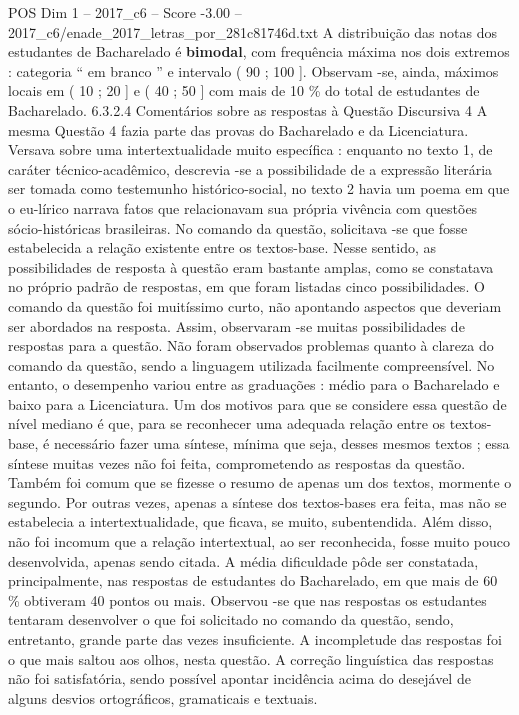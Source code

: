\begin{textsample}{POS Dim 1 – 2017\_c6 – Score -3.00 – 2017\_c6/enade\_2017\_letras\_por\_281c81746d.txt}
A distribuição das notas dos estudantes de Bacharelado é \textbf{bimodal}, com frequência máxima nos dois extremos : categoria “ em branco ” e intervalo ( 90 ; 100 ].
Observam -se, ainda, máximos locais em ( 10 ; 20 ] e ( 40 ; 50 ] com mais de 10 \% do total de estudantes de Bacharelado. 6.3.2.4 Comentários sobre as respostas à Questão Discursiva 4 A mesma Questão 4 fazia parte das provas do Bacharelado e da Licenciatura.
Versava sobre uma intertextualidade muito específica : enquanto no texto 1, de caráter técnico-acadêmico, descrevia -se a possibilidade de a expressão literária ser tomada como testemunho histórico-social, no texto 2 havia um poema em que o eu-lírico narrava fatos que relacionavam sua própria vivência com questões sócio-históricas brasileiras.
No comando da questão, solicitava -se que fosse estabelecida a relação existente entre os textos-base.
Nesse sentido, as possibilidades de resposta à questão eram bastante amplas, como se constatava no próprio padrão de respostas, em que foram listadas cinco possibilidades.
O comando da questão foi muitíssimo curto, não apontando aspectos que deveriam ser abordados na resposta.
Assim, observaram -se muitas possibilidades de respostas para a questão.
Não foram observados problemas quanto à clareza do comando da questão, sendo a linguagem utilizada facilmente compreensível.
No entanto, o desempenho variou entre as graduações : médio para o Bacharelado e baixo para a Licenciatura.
Um dos motivos para que se considere essa questão de nível mediano é que, para se reconhecer uma adequada relação entre os textos-base, é necessário fazer uma síntese, mínima que seja, desses mesmos textos ; essa síntese muitas vezes não foi feita, comprometendo as respostas da questão.
Também foi comum que se fizesse o resumo de apenas um dos textos, mormente o segundo.
Por outras vezes, apenas a síntese dos textos-bases era feita, mas não se estabelecia a intertextualidade, que ficava, se muito, subentendida.
Além disso, não foi incomum que a relação intertextual, ao ser reconhecida, fosse muito pouco desenvolvida, apenas sendo citada.
A média dificuldade pôde ser constatada, principalmente, nas respostas de estudantes do Bacharelado, em que mais de 60 \% obtiveram 40 pontos ou mais.
Observou -se que nas respostas os estudantes tentaram desenvolver o que foi solicitado no comando da questão, sendo, entretanto, grande parte das vezes insuficiente.
A incompletude das respostas foi o que mais saltou aos olhos, nesta questão.
A correção linguística das respostas não foi satisfatória, sendo possível apontar incidência acima do desejável de alguns desvios ortográficos, gramaticais e textuais.

\end{textsample}
